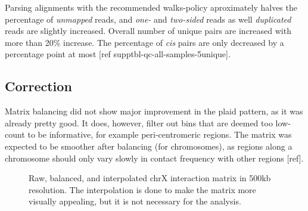 \documentclass[
  11pt,
  a4paper,
]{scrbook}
\let\oldemph\emph
\renewcommand\emph[1]{\oldemph{\color{gray}#1}}
\begin{document}
Parsing alignments with the recommended walks-policy aproximately halves
the percentage of \emph{unmapped} reads, and \emph{one-} and
\emph{two-sided} reads as well \emph{duplicated} reads are slightly
increased. Overall number of unique pairs are increased with more than
20\% increase. The percentage of \emph{cis} pairs are only decreased by
a percentage point at most {[}ref supptbl-qc-all-samples-5unique{]}.

\subsection{Correction}\label{correction-1}

Matrix balancing did not show major improvement in the plaid pattern, as
it was already pretty good. It does, however, filter out bins that are
deemed too low-count to be informative, for example peri-centromeric
regions. The matrix was expected to be smoother after balancing (for
chromosomes), as regions along a chromosome should only vary slowly in
contact frequency with other regions {[}ref{]}.

\begin{figure}[H]


\caption{\label{fig-rs-chrx-raw-balanced-cgi}Raw, balanced, and
interpolated chrX interaction matrix in 500kb resolution. The
interpolation is done to make the matrix more visually appealing, but it
is not necessary for the analysis.}

\end{figure}%
\end{document}
